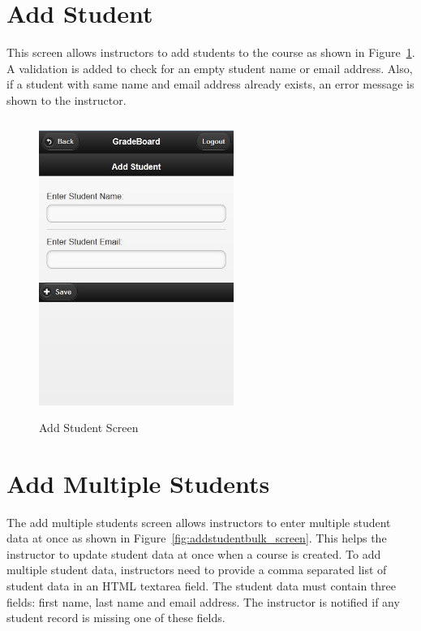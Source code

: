 \newpage
\section{Add Student}
This screen allows instructors to add students to the course as shown in Figure~\ref{fig:addstudent_screen}. A validation is added to check for an empty student name or email address. Also, if a student with same name and email address already exists, an error message is shown to the instructor.
\vspace{3em}
\begin{figure}[H]
\begin{center}
\includegraphics[height=3.8in,width=2.5in]{images/addstudent_screen.jpg}
\caption{Add Student Screen}
\label{fig:addstudent_screen}
\end{center}
\end{figure}

\newpage
\section{Add Multiple Students}
The add multiple students screen allows instructors to enter multiple student data at once as shown in Figure~\ref{fig:addstudentbulk_screen}. This helps the instructor to update student data at once when a course is created. To add multiple student data, instructors need to provide a comma separated list of student data in an HTML textarea field. The student data must contain three fields: first name, last name and email address. The instructor is notified if any student record is missing one of these fields.

